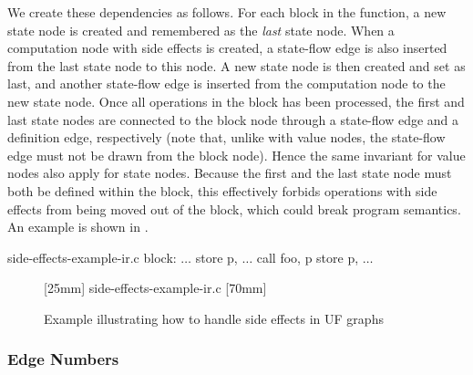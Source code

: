 We create these dependencies as follows.
%
For each \gls{block} in the \gls{function}, a new \gls{state node} is created
and remembered as the \emph{last} \gls{state node}.
%
When a \gls{computation node} with side effects is created, a \gls{state-flow
  edge} is also inserted from the last \gls{state node} to this \gls{node}.
%
A new \gls{state node} is then created and set as last, and another
\gls{state-flow edge} is inserted from the \gls{computation node} to the new
\gls{state node}.
%
Once all \glspl{operation} in the \gls{block} has been processed, the first and
last \glspl{state node} are connected to the \gls{block node} through a
\gls{state-flow edge} and a \gls{definition edge}, respectively (note that,
unlike with \glspl{value node}, the \gls{state-flow edge} must not be drawn from
the  \gls{block node}).
%
Hence the same invariant for \glspl{value node} also apply for \glspl{state
  node}.
%
Because the first and the last \gls{state node} must both be defined within the
\gls{block}, this effectively forbids \glspl{operation} with side effects from
being moved out of the \gls{block}, which could break \gls{program} semantics.
%
An example is shown in .
%
\begin{filecontents*}{side-effects-example-ir.c}
block:
  $\ldots$
  store p, $\ldots$
  call foo, p
  store p, $\ldots$
\end{filecontents*}
%
\begin{figure}
  \centering%
  \mbox{}%
  \hfill%
                [25mm]%
                {%
                                  {side-effects-example-ir.c}%
                }%
  \hfill%
                [70mm]%
                {%
                }%
  \hfill%
  \mbox{}

  \caption{Example illustrating how to handle side effects in UF graphs}%
\end{figure}


\subsubsection{Edge Numbers}

